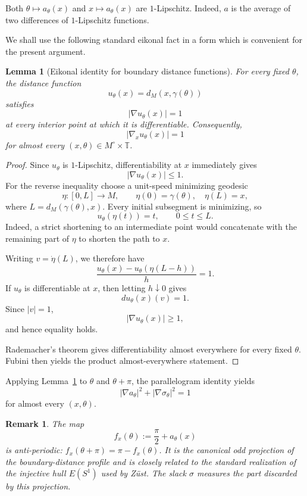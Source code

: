 \documentclass[11pt]{article}
\newtheorem{lemma}[theorem]{Lemma}
\newtheorem{remark}[theorem]{Remark}
\newcommand{\T}{\mathbb T}
\begin{document}
Both $\theta\mapsto a_\theta(x)$ and $x\mapsto a_\theta(x)$ are
$1$-Lipschitz.  Indeed, $a$ is the average of two differences of
$1$-Lipschitz functions.

We shall use the following standard eikonal fact in a form which is
convenient for the present argument.

\begin{lemma}[Eikonal identity for boundary distance functions]
\label{lem:eikonal-distance}
For every fixed $\theta$, the distance function
\[
        u_\theta(x)=d_M(x,\gamma(\theta))
\]
satisfies
\[
        |\nabla u_\theta(x)|=1
\]
at every interior point at which it is differentiable.  Consequently,
\[
        |\nabla_xu_\theta(x)|=1
\]
for almost every $(x,\theta)\in M^\circ\times\T$.
\end{lemma}

\begin{proof}
Since $u_\theta$ is $1$-Lipschitz, differentiability at $x$ immediately
gives
\[
        |\nabla u_\theta(x)|\le1.
\]
For the reverse inequality choose a unit-speed minimizing geodesic
\[
        \eta:[0,L]\to M,\qquad
        \eta(0)=\gamma(\theta),\quad \eta(L)=x,
\]
where $L=d_M(\gamma(\theta),x)$.  Every initial subsegment is minimizing,
so
\[
        u_\theta(\eta(t))=t,\qquad0\le t\le L.
\]
Indeed, a strict shortening to an intermediate point would concatenate
with the remaining part of $\eta$ to shorten the path to $x$.

Writing $v=\dot\eta(L)$, we therefore have
\[
 \frac{
 u_\theta(x)-u_\theta(\eta(L-h))
 }{h}=1.
\]
If $u_\theta$ is differentiable at $x$, then letting $h\downarrow0$ gives
\[
        du_\theta(x)(v)=1.
\]
Since $|v|=1$,
\[
        |\nabla u_\theta(x)|\ge1,
\]
and hence equality holds.

Rademacher's theorem gives differentiability almost everywhere for every
fixed $\theta$.  Fubini then yields the product almost-everywhere
statement.
\end{proof}

Applying Lemma~\ref{lem:eikonal-distance} to $\theta$ and
$\theta+\pi$, the parallelogram identity yields
\begin{equation}\label{eq:parallelogram-slack}
        \boxed{
        |\nabla a_\theta|^2+|\nabla\sigma_\theta|^2=1
        }
\end{equation}
for almost every $(x,\theta)$.

\begin{remark}
The map
\[
        f_x(\theta):=\frac{\pi}{2}+a_\theta(x)
\]
is anti-periodic:
$f_x(\theta+\pi)=\pi-f_x(\theta)$.
It is the canonical odd projection of the boundary-distance profile and
is closely related to the standard realization of the injective hull
$E(S^1)$ used by Z\"ust.  The slack $\sigma$ measures the part discarded
by this projection.
\end{remark}
\end{document}
